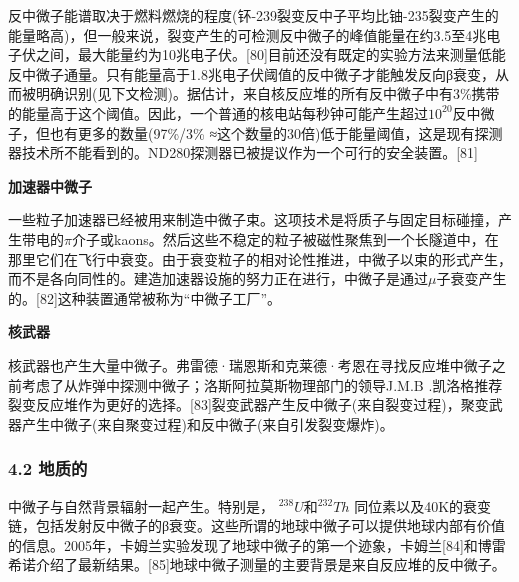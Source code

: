 反中微子能谱取决于燃料燃烧的程度(钚-239裂变反中子平均比铀-235裂变产生的能量略高)，但一般来说，裂变产生的可检测反中微子的峰值能量在约3.5至4兆电子伏之间，最大能量约为10兆电子伏。[80]目前还没有既定的实验方法来测量低能反中微子通量。只有能量高于1.8兆电子伏阈值的反中微子才能触发反向β衰变，从而被明确识别(见下文检测)。据估计，来自核反应堆的所有反中微子中有3\%携带的能量高于这个阈值。因此，一个普通的核电站每秒钟可能产生超过$10^{20}$反中微子，但也有更多的数量(97\%/3\% ≈这个数量的30倍)低于能量阈值，这是现有探测器技术所不能看到的。ND280探测器已被提议作为一个可行的安全装置。[81]

\textbf{加速器中微子}

一些粒子加速器已经被用来制造中微子束。这项技术是将质子与固定目标碰撞，产生带电的$\pi$介子或kaons。然后这些不稳定的粒子被磁性聚焦到一个长隧道中，在那里它们在飞行中衰变。由于衰变粒子的相对论性推进，中微子以束的形式产生，而不是各向同性的。建造加速器设施的努力正在进行，中微子是通过$\mu$子衰变产生的。[82]这种装置通常被称为“中微子工厂”。

\textbf{核武器}

核武器也产生大量中微子。弗雷德·瑞恩斯和克莱德·考恩在寻找反应堆中微子之前考虑了从炸弹中探测中微子；洛斯阿拉莫斯物理部门的领导J.M.B .凯洛格推荐裂变反应堆作为更好的选择。[83]裂变武器产生反中微子(来自裂变过程)，聚变武器产生中微子(来自聚变过程)和反中微子(来自引发裂变爆炸)。

\subsubsection{4.2 地质的}
中微子与自然背景辐射一起产生。特别是， $^{238}U$和$^{232}Th$ 同位素以及40K的衰变链，包括发射反中微子的β衰变。这些所谓的地球中微子可以提供地球内部有价值的信息。2005年，卡姆兰实验发现了地球中微子的第一个迹象，卡姆兰[84]和博雷希诺介绍了最新结果。[85]地球中微子测量的主要背景是来自反应堆的反中微子。